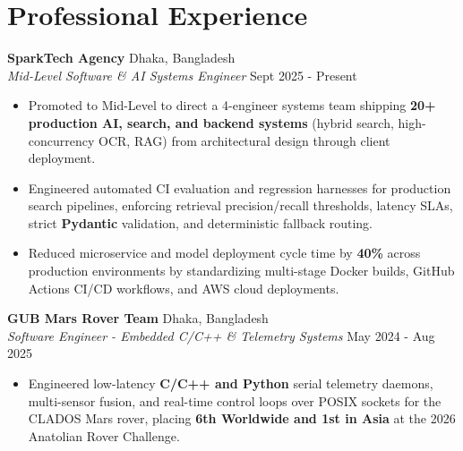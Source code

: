 \documentclass[9.5pt,a4paper]{article}
\begin{document}
\section*{Professional Experience}
\noindent
\textbf{SparkTech Agency} \hfill Dhaka, Bangladesh\\
\textit{Mid-Level Software & AI Systems Engineer} \hfill Sept 2025 - Present
\begin{itemize}
    \item Promoted to Mid-Level to direct a 4-engineer systems team shipping \textbf{20+ production AI, search, and backend systems} (hybrid search, high-concurrency OCR, RAG) from architectural design through client deployment.
    \item Engineered automated CI evaluation and regression harnesses for production search pipelines, enforcing retrieval precision/recall thresholds, latency SLAs, strict \textbf{Pydantic} validation, and deterministic fallback routing.
    \item Reduced microservice and model deployment cycle time by \textbf{40\%} across production environments by standardizing multi-stage Docker builds, GitHub Actions CI/CD workflows, and AWS cloud deployments.
\end{itemize}
\vspace{0.6pt}
\noindent
\textbf{GUB Mars Rover Team} \hfill Dhaka, Bangladesh\\
\textit{Software Engineer - Embedded C/C++ & Telemetry Systems} \hfill May 2024 - Aug 2025
\begin{itemize}
    \item Engineered low-latency \textbf{C/C++ and Python} serial telemetry daemons, multi-sensor fusion, and real-time control loops over POSIX sockets for the CLADOS Mars rover, placing \textbf{6th Worldwide and 1st in Asia} at the 2026 Anatolian Rover Challenge.
\end{itemize}
\vspace{0.6pt}
\end{document}
